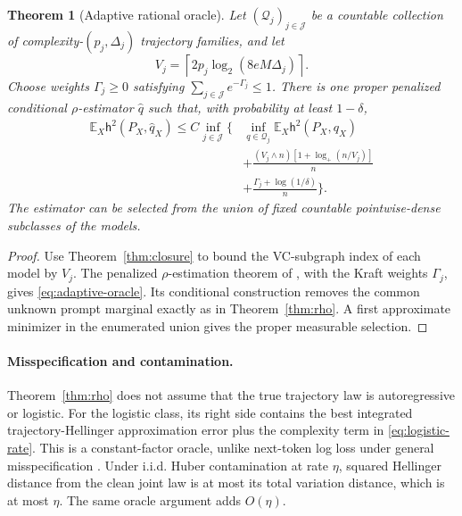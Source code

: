 \documentclass[twoside]{article}
\newtheorem{theorem}{Theorem}
\newcommand{\E}{\mathbb E}
\newcommand{\Q}{\mathcal Q}
\newcommand{\h}{\mathsf h}
\begin{document}
\begin{theorem}[Adaptive rational oracle]
\label{thm:adaptive}
Let $(\Q_j)_{j\in\mathcal J}$ be a countable collection of complexity-$(p_j,\Delta_j)$ trajectory families, and let
\[
 V_j=\left\lceil2p_j\log_2(8eM\Delta_j)\right\rceil.
\]
Choose weights $\Gamma_j\geq0$ satisfying $\sum_{j\in\mathcal J}e^{-\Gamma_j}\leq1$. There is one proper penalized conditional $\rho$-estimator $\widehat q$ such that, with probability at least $1-\delta$,
\begin{align}
 \E_X\h^2(P_X,\widehat q_X)
 \leq C\inf_{j\in\mathcal J}\bigg\{&\inf_{q\in\Q_j}\E_X\h^2(P_X,q_X)\nonumber\\
 &+\frac{(V_j\wedge n)[1+\log_+(n/V_j)]}{n}\nonumber\\
 &+\frac{\Gamma_j+\log(1/\delta)}{n}\bigg\}.
 \label{eq:adaptive-oracle}
\end{align}
The estimator can be selected from the union of fixed countable pointwise-dense subclasses of the models.
\end{theorem}

\begin{proof}
Use Theorem~\ref{thm:closure} to bound the VC-subgraph index of each model by $V_j$. The penalized $\rho$-estimation theorem of \citet{baraud2018}, with the Kraft weights $\Gamma_j$, gives \eqref{eq:adaptive-oracle}. Its conditional construction removes the common unknown prompt marginal exactly as in Theorem~\ref{thm:rho}. A first approximate minimizer in the enumerated union gives the proper measurable selection.
\end{proof}

\paragraph{Misspecification and contamination.} Theorem~\ref{thm:rho} does not assume that the true trajectory law is autoregressive or logistic. For the logistic class, its right side contains the best integrated trajectory-Hellinger approximation error plus the complexity term in \eqref{eq:logistic-rate}. This is a constant-factor oracle, unlike next-token log loss under general misspecification \citep{rohatgi2025}. Under i.i.d. Huber contamination at rate $\eta$, squared Hellinger distance from the clean joint law is at most its total variation distance, which is at most $\eta$. The same oracle argument adds $O(\eta)$.
\end{document}
